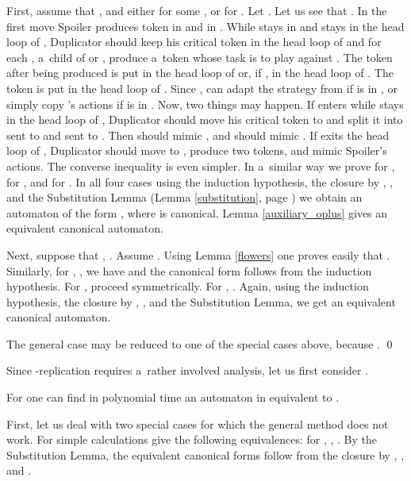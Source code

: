 \documentclass{LMCS}
\begin{document}
First, assume that , and either  for some , or  for . Let . Let us see that  . In the first move Spoiler produces token  in  and  in . While  stays in  and  stays in the head loop of ,  Duplicator should keep his critical token in the head loop of  and for each , a~child of  or , produce a~token  whose task is to play against . The token  after being produced is put in the head loop of  or, if , in the head loop of . The token  is put in the head loop of . Since ,  can adapt the strategy from  if  is in , or simply copy 's actions if  is in . Now, two things may happen. If  enters  while  stays in the head loop of , Duplicator should move his critical token to  and split it into  sent to  and  sent to . Then  should mimic , and  should mimic . If  exits the head loop of , Duplicator should move to , produce two tokens, and mimic Spoiler's actions. The converse inequality is even simpler. In a~similar way we prove  for ,  for , and  for . In all four cases using the induction hypothesis, the closure by , , and the Substitution Lemma (Lemma \ref{substitution}, page \pageref{substitution}) we obtain an automaton of the form , where  is canonical. Lemma \ref{auxiliary_oplus} gives an equivalent canonical automaton. 

Next, suppose that , . Assume . Using Lemma \ref{flowers} one proves easily that .  Similarly, for , , we have  and the canonical form follows from the induction hypothesis. For ,  proceed symmetrically. For , . Again, using the induction hypothesis, the closure by , , and the Substitution Lemma, we get an equivalent canonical automaton. 

The general case may be reduced to one of the special cases above, because  . \qed

\vspace{5pt}

Since -replication requires a~rather involved analysis, let us first consider . 

\begin{prop}\label{to_closure}
For  one can find in polynomial time an automaton in  equivalent to .
\end{prop}

\proof First, let us deal with two special cases for which the general method does not work. For  simple calculations give the following equivalences:  for , , . By the Substitution Lemma, the equivalent canonical forms follow from the closure by , , and .
\end{document}
